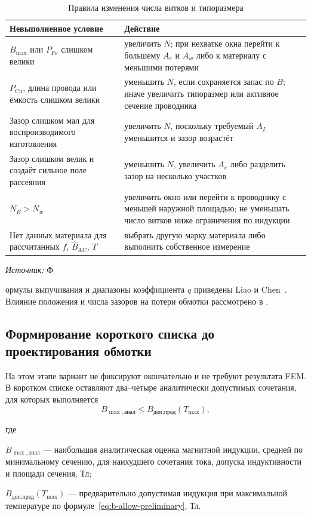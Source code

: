 \documentclass[14pt,a4paper]{extarticle}
\newcommand{\source}[1]{\par\noindent\textit{Источник:} #1\par}
\newenvironment{whereblock}
 {\par\noindent где\par
  \begin{list}{}{\setlength{\leftmargin}{12.5mm}
                  \setlength{\itemindent}{-12.5mm}
                  \setlength{\itemsep}{0pt}
                  \setlength{\parsep}{0pt}
                  \setlength{\topsep}{0pt}}}
 {\end{list}}
\newcommand{\whereitem}[2]{\item[] #1 --- #2}
\begin{document}
\begin{table}[H]
\caption{Правила изменения числа витков и типоразмера}
\label{tab:iteration-direction}
\centering
\small
\begin{tabularx}{\textwidth}{>{\raggedright\arraybackslash}p{48mm} X}
\toprule
Невыполненное условие & Действие \\
\midrule
$B_{\max}$ или $P_{\text{Fe}}$ слишком велики &
увеличить $N$; при нехватке окна перейти к большему $A_e$ и $A_w$ либо к
материалу с меньшими потерями \\
$P_{\text{Cu}}$, длина провода или ёмкость слишком велики &
уменьшить $N$, если сохраняется запас по $B$; иначе увеличить типоразмер
или активное сечение проводника \\
Зазор слишком мал для воспроизводимого изготовления &
увеличить $N$, поскольку требуемый $A_L$ уменьшится и зазор возрастёт \\
Зазор слишком велик и создаёт сильное поле рассеяния &
уменьшить $N$, увеличить $A_e$ либо разделить зазор на несколько участков \\
$N_B>N_w$ &
увеличить окно или перейти к проводнику с меньшей наружной площадью; не
уменьшать число витков ниже ограничения по индукции \\
Нет данных материала для рассчитанных $f$, $\widehat B_{\text{AC}}$, $T$ &
выбрать другую марку материала либо выполнить собственное измерение \\
\bottomrule
\end{tabularx}
\end{table}

\source Формулы выпучивания и диапазоны коэффициента $q$ приведены Liao
и Chen~\cite{liao}. Влияние положения и числа зазоров на потери обмотки
рассмотрено в \cite{papamanolis,ewald_litz,meng}.

\subsection{Формирование короткого списка до проектирования обмотки}

На этом этапе вариант не фиксируют окончательно и не требуют результата
FEM. В коротком списке оставляют два--четыре аналитически допустимых
сочетания, для которых выполняется
\begin{equation}
 B_{\max,\text{анал}}
 \leq B_{\text{доп,пред}}\!\left(T_{\max}\right),
 \label{eq:b-acceptance}
\end{equation}
\begin{whereblock}
\whereitem{$B_{\max,\text{анал}}$}{наибольшая аналитическая оценка
магнитной индукции, средней по минимальному сечению, для наихудшего
сочетания тока, допуска индуктивности и площади сечения, Тл;}
\whereitem{$B_{\text{доп,пред}}(T_{\max})$}{предварительно допустимая
индукция при максимальной температуре по
формуле~\eqref{eq:b-allow-preliminary}, Тл.}
\end{whereblock}
\end{document}
